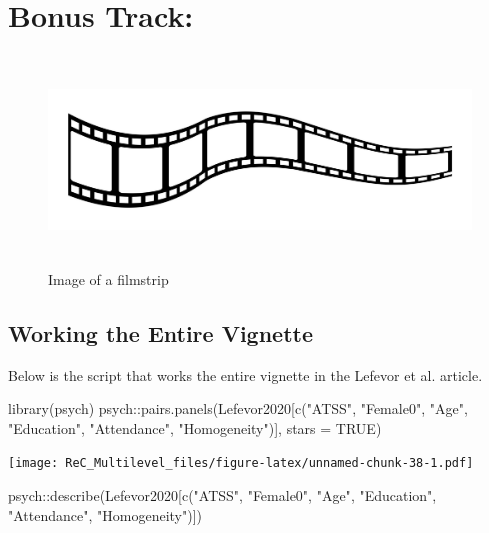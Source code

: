 \documentclass[
  11pt,
]{book}
\newenvironment{Shaded}{\begin{snugshade}}{\end{snugshade}}
\newcommand{\AttributeTok}[1]{\textcolor[rgb]{0.77,0.63,0.00}{#1}}
\newcommand{\ConstantTok}[1]{\textcolor[rgb]{0.00,0.00,0.00}{#1}}
\newcommand{\FunctionTok}[1]{\textcolor[rgb]{0.00,0.00,0.00}{#1}}
\newcommand{\NormalTok}[1]{#1}
\newcommand{\SpecialCharTok}[1]{\textcolor[rgb]{0.00,0.00,0.00}{#1}}
\newcommand{\StringTok}[1]{\textcolor[rgb]{0.31,0.60,0.02}{#1}}
\begin{document}
\hypertarget{bonus-track}{%
\section{Bonus Track:}\label{bonus-track}}

\begin{figure}
\hypertarget{id}{%
\centering
\includegraphics[width=6.45833in,height=2.19792in]{images/film-strip-1.jpg}
\caption{Image of a filmstrip}\label{id}
}
\end{figure}

\hypertarget{working-the-entire-vignette}{%
\subsection{Working the Entire Vignette}\label{working-the-entire-vignette}}

Below is the script that works the entire vignette in the Lefevor et al. \citeyearpar{lefevor_homonegativity_2020} article.

\begin{Shaded}
\begin{Highlighting}[]
\FunctionTok{library}\NormalTok{(psych)}
\NormalTok{psych}\SpecialCharTok{::}\FunctionTok{pairs.panels}\NormalTok{(Lefevor2020[}\FunctionTok{c}\NormalTok{(}\StringTok{"ATSS"}\NormalTok{, }\StringTok{"Female0"}\NormalTok{, }\StringTok{"Age"}\NormalTok{, }\StringTok{"Education"}\NormalTok{, }\StringTok{"Attendance"}\NormalTok{, }\StringTok{"Homogeneity"}\NormalTok{)], }\AttributeTok{stars =} \ConstantTok{TRUE}\NormalTok{)}
\end{Highlighting}
\end{Shaded}

\texttt{[image: ReC\_Multilevel\_files/figure-latex/unnamed-chunk-38-1.pdf]}

\begin{Shaded}
\begin{Highlighting}[]
\NormalTok{psych}\SpecialCharTok{::}\FunctionTok{describe}\NormalTok{(Lefevor2020[}\FunctionTok{c}\NormalTok{(}\StringTok{"ATSS"}\NormalTok{, }\StringTok{"Female0"}\NormalTok{, }\StringTok{"Age"}\NormalTok{, }\StringTok{"Education"}\NormalTok{, }\StringTok{"Attendance"}\NormalTok{, }\StringTok{"Homogeneity"}\NormalTok{)])}
\end{Highlighting}
\end{Shaded}
\end{document}
